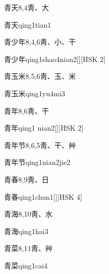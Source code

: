 \begin{Entry}{青天}{8,4}{⾭、⼤}
  \begin{Phonetics}{青天}{qing1tian1}
  \end{Phonetics}
\end{Entry}

\begin{Entry}{青少年}{8,4,6}{⾭、⼩、⼲}
  \begin{Phonetics}{青少年}{qing1shao4nian2}[][HSK 2]
  \end{Phonetics}
\end{Entry}

\begin{Entry}{青玉米}{8,5,6}{⾭、⽟、⽶}
  \begin{Phonetics}{青玉米}{qing1yu4mi3}
  \end{Phonetics}
\end{Entry}

\begin{Entry}{青年}{8,6}{⾭、⼲}
  \begin{Phonetics}{青年}{qing1 nian2}[][HSK 2]
  \end{Phonetics}
\end{Entry}

\begin{Entry}{青年节}{8,6,5}{⾭、⼲、⾋}
  \begin{Phonetics}{青年节}{qing1nian2jie2}
  \end{Phonetics}
\end{Entry}

\begin{Entry}{青春}{8,9}{⾭、⽇}
  \begin{Phonetics}{青春}{qing1chun1}[][HSK 4]
  \end{Phonetics}
\end{Entry}

\begin{Entry}{青海}{8,10}{⾭、⽔}
  \begin{Phonetics}{青海}{qing1hai3}
  \end{Phonetics}
\end{Entry}

\begin{Entry}{青菜}{8,11}{⾭、⾋}
  \begin{Phonetics}{青菜}{qing1cai4}
  \end{Phonetics}
\end{Entry}

